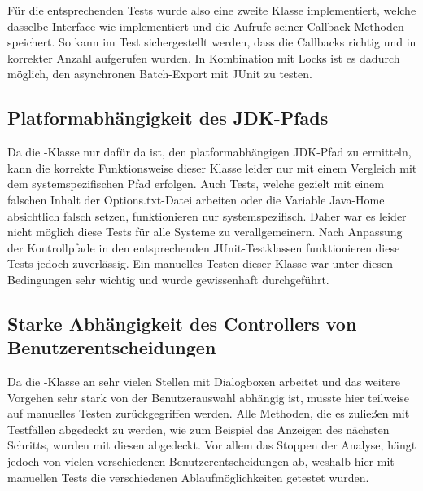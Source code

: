 Für die entsprechenden Tests wurde also eine zweite Klasse implementiert, welche dasselbe Interface wie  implementiert und die Aufrufe seiner Callback-Methoden speichert.
So kann im Test sichergestellt werden, dass die Callbacks richtig und in korrekter Anzahl aufgerufen wurden.
In Kombination mit Locks ist es dadurch möglich, den asynchronen Batch-Export mit JUnit zu testen.

\subsection{Platformabhängigkeit des JDK-Pfads}

Da die -Klasse nur dafür da ist, den platformabhängigen JDK-Pfad zu ermitteln, kann die korrekte Funktionsweise dieser Klasse leider nur mit einem Vergleich mit dem systemspezifischen Pfad erfolgen. Auch Tests, welche gezielt mit einem falschen Inhalt der Options.txt-Datei arbeiten oder die Variable Java-Home absichtlich falsch setzen, funktionieren nur systemspezifisch. Daher war es leider nicht möglich diese Tests für alle Systeme zu verallgemeinern. Nach Anpassung der Kontrollpfade in den entsprechenden JUnit-Testklassen funktionieren diese Tests jedoch zuverlässig. Ein manuelles Testen dieser Klasse war unter diesen Bedingungen sehr wichtig und wurde gewissenhaft durchgeführt.

\subsection{Starke Abhängigkeit des Controllers von Benutzerentscheidungen}

Da die -Klasse an sehr vielen Stellen mit Dialogboxen arbeitet und das weitere Vorgehen sehr stark von der Benutzerauswahl abhängig ist, musste hier teilweise auf manuelles Testen zurückgegriffen werden. Alle Methoden, die es zuließen mit Testfällen abgedeckt zu werden, wie zum Beispiel das Anzeigen des nächsten Schritts, wurden mit diesen abgedeckt. Vor allem das Stoppen der Analyse, hängt jedoch von vielen verschiedenen Benutzerentscheidungen ab, weshalb hier mit manuellen Tests die verschiedenen Ablaufmöglichkeiten getestet wurden.
